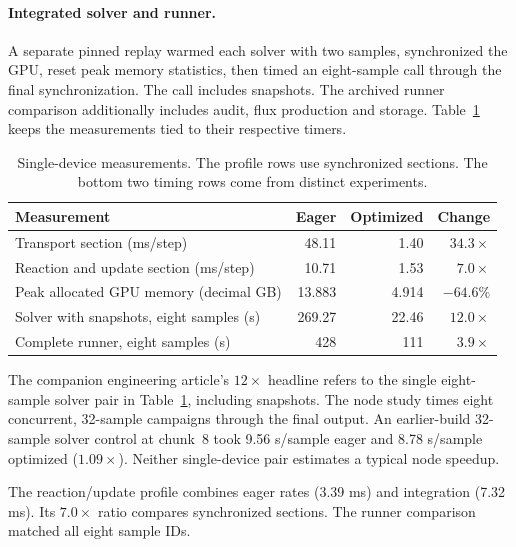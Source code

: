 \documentclass{article}
\begin{document}
\paragraph{Integrated solver and runner.}
A separate pinned replay warmed each solver with two samples, synchronized the GPU, reset peak memory statistics, then timed an eight-sample call through the final synchronization. The call includes snapshots. The archived runner comparison additionally includes audit, flux production and storage. Table~\ref{tab:scope} keeps the measurements tied to their respective timers.

\begin{table}[ht]\centering\small
\caption{Single-device measurements. The profile rows use synchronized sections. The bottom two timing rows come from distinct experiments.}\label{tab:scope}
\begin{tabular}{lrrr}\toprule
Measurement & Eager & Optimized & Change\\\midrule
Transport section (ms/step) &48.11&1.40&$34.3\times$\\
Reaction and update section (ms/step) &10.71&1.53&$7.0\times$\\
Peak allocated GPU memory (decimal GB) &13.883&4.914&$-64.6\%$\\
Solver with snapshots, eight samples (s) &269.27&22.46&$12.0\times$\\
Complete runner, eight samples (s) &428&111&$3.9\times$\\\bottomrule
\end{tabular}
\end{table}

The companion engineering article's $12\times$ headline \citep{blog} refers to the single eight-sample solver pair in Table~\ref{tab:scope}, including snapshots. The node study times eight concurrent, 32-sample campaigns through the final output. An earlier-build 32-sample solver control at chunk~8 took 9.56 s/sample eager and 8.78 s/sample optimized ($1.09\times$). Neither single-device pair estimates a typical node speedup.

The reaction/update profile combines eager rates (3.39 ms) and integration (7.32 ms). Its $7.0\times$ ratio compares synchronized sections. The runner comparison matched all eight sample IDs.
\end{document}
